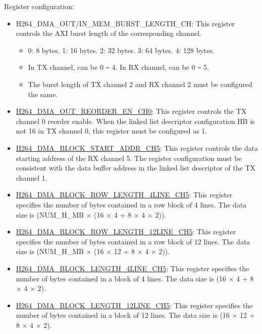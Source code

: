 \documentclass[main\_\_EN.tex]{subfiles}
\begin{document}
Register configuration:
\begin{itemize}
    \item H264\_DMA\_OUT/IN\_MEM\_BURST\_LENGTH\_CH: This register controls the AXI burst length of the corresponding channel.
    \begin{itemize}
        \item 0: 8 bytes. 1: 16 bytes. 2: 32 bytes. 3: 64 bytes. 4: 128 bytes.
        \item In TX channel,  can be 0 \verb+~+ 4. In RX channel,  can be 0 \verb+~+ 5.
        \item The burst length of TX channel 2 and RX channel 2 must be configured the same.
    \end{itemize}
    \item \hyperref[fielddesc:H264DMAOUTREORDERENCH0]{H264\_DMA\_OUT\_REORDER\_EN\_CH0}: This register controls the TX channel 0 reorder enable. When the linked list descriptor configuration HB is not 16 in TX channel 0, this register must be configured as 1.
    \item \hyperref[fielddesc:H264DMABLOCKSTARTADDRCH5]{H264\_DMA\_BLOCK\_START\_ADDR\_CH5}: This register controls the data starting address of the RX channel 5. The register configuration must be consistent with the data buffer address in the linked list descriptor of the TX channel 1.
    \item \hyperref[fielddesc:H264DMABLOCKROWLENGTH4LINECH5]{H264\_DMA\_BLOCK\_ROW\_LENGTH\_4LINE\_CH5}: This register specifies the number of bytes contained in a row block of 4 lines. The data size is (NUM\_H\_MB × (16 × 4 + 8 × 4 × 2)).
    \item \hyperref[fielddesc:H264DMABLOCKROWLENGTH12LINECH5]{H264\_DMA\_BLOCK\_ROW\_LENGTH\_12LINE\_CH5}: This register specifies the number of bytes contained in a row block of 12 lines. The data size is (NUM\_H\_MB × (16 × 12 + 8 × 4 × 2)).
    \item \hyperref[fielddesc:H264DMABLOCKLENGTH4LINECH5]{H264\_DMA\_BLOCK\_LENGTH\_4LINE\_CH5}: This register specifies the number of bytes contained in a block of 4 lines. The data size is (16 × 4 + 8 × 4 × 2).
    \item \hyperref[fielddesc:H264DMABLOCKLENGTH12LINECH5]{H264\_DMA\_BLOCK\_LENGTH\_12LINE\_CH5}: This register specifies the number of bytes contained in a block of 12 lines. The data size is (16 × 12 + 8 × 4 × 2).
\end{itemize}

\end{document}
